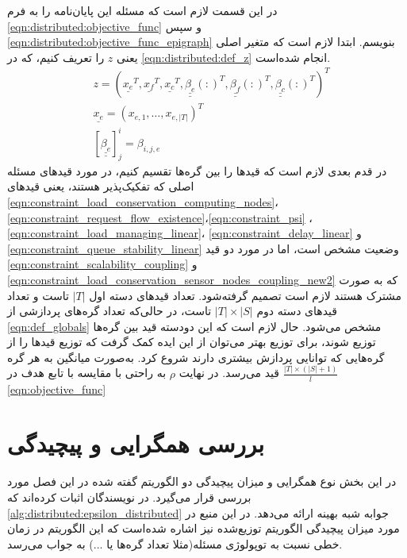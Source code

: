 	در این قسمت لازم است که مسئله این پایان‌نامه را به فرم \cref{eqn:distributed:objective_func} و سپس \cref{eqn:distributed:objective_func_epigraph} بنویسم. ابتدا لازم است که متغیر اصلی یعنی $z$ را تعریف کنیم، که در \cref{eqn:distributed:def_z} انجام شده‌است. 
\begin{subequations}\label{eqn:distributed:def_z}
	\begin{align}
		&z = (\underline{x_e}^T, \underline{x_f}^T, \underline{x_c}^T, \underline{\underline{\beta_{e}}}(:)^T, \underline{\underline{\beta_{f}}}(:)^T, \underline{\underline{\beta_{c}}}(:)^T)^T \\
		&\underline{x_e} = (x_{e,1}, \dots, x_{e,|T|})^T \\
		&[\underline{\underline{\beta_{e}}}]^i_j = \beta_{i,j,e}
	\end{align}
\end{subequations}
در قدم بعدی لازم است که قیدها را بین گره‌ها تقسیم کنیم، در مورد قیدهای مسئله اصلی که تفکیک‌پذیر هستند، یعنی قیدهای \cref{eqn:constraint_load_conservation_computing_nodes}، \cref{eqn:constraint_request_flow_existence}،\cref{eqn:constraint_psi} ، \cref{eqn:constraint_load_managing_linear}، \cref{eqn:constraint_delay_linear} و \cref{eqn:constraint_queue_stability_linear} وضعیت مشخص است، اما در مورد دو قید \cref{eqn:constraint_scalability_coupling} و \cref{eqn:constraint_load_conservation_sensor_nodes_coupling_new2} که به صورت مشترک هستند لازم است تصمیم گرفته‌شود. تعداد قیدهای دسته اول $|T|$ تاست و تعداد قیدهای دسته دوم $|T| \times |S|$ تاست، در حالی‌که تعداد گره‌های پردازشی از \cref{eqn:def_globals} مشخص می‌شود. حال لازم است که این دودسته قید بین گره‌ها توزیع شوند، برای توزیع بهتر می‌توان از این ایده کمک گرفت که توزیع قیدها را از گره‌هایی که توانایی پردازش بیشتری دارند شروع کرد. به‌صورت میانگین به هر گره $\frac{|T|\times(|S|+1)}{l}$ قید می‌رسد. در نهایت $\rho$ به راحتی با مقایسه با تابع هدف در \cref{eqn:objective_func}

\section{بررسی همگرایی و پیچیدگی}
	در این بخش نوع همگرایی و میزان پیچیدگی دو الگوریتم گفته شده در این فصل مورد بررسی قرار می‌گیرد. 
	در \cite{testa2019distributed} نویسندگان اثبات کرده‌اند که \cref{alg:distributed:epsilon_distributed} جوابه شبه بهینه ارائه می‌دهد. 
	در این منبع در مورد میزان پیچیدگی الگوریتم توزیع‌شده نیز اشاره شده‌است که این الگوریتم در زمان خطی نسبت به توپولوژی مسئله(مثلا تعداد گره‌ها یا ...) به جواب می‌رسد. 
	

